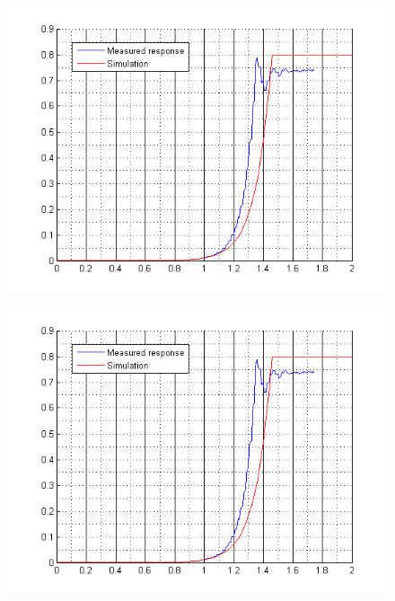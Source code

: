 
\begin{minipage}{\linewidth}
	\begin{minipage}{0.45\linewidth}
		\begin{figure}[H]
			\includegraphics[scale=.53]{figures/comparisonRealModel}
			\centering
			\vspace{-.4cm}
			\captionsetup{justification=centering}
			\label{HbridgeClokwise4Q}
		\end{figure}\vspace{-5mm}
	\end{minipage}
	\hspace{0.03\linewidth}
	\begin{minipage}{0.45\linewidth}
		\begin{figure}[H]
			\includegraphics[scale=.53]{figures/comparisonRealModel}

\end{figure}
\end{minipage}
\end{minipage}

